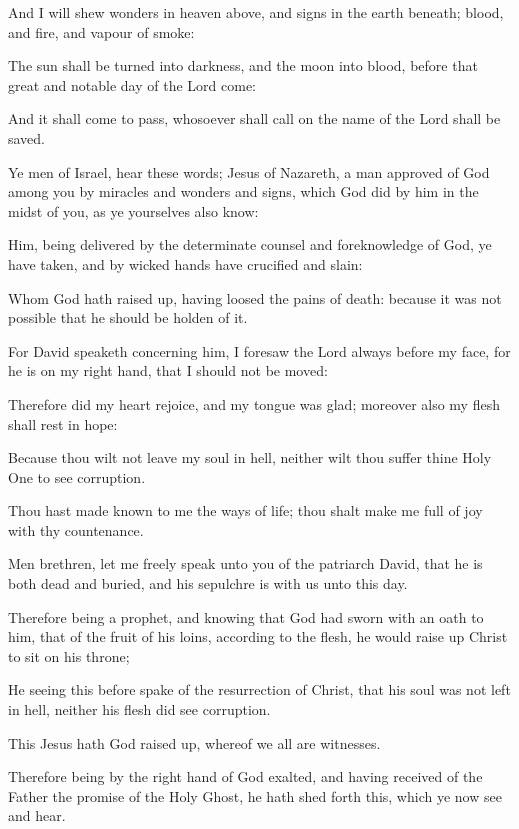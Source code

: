 {And I will
shew
wonders
in
heaven
above,
and
signs
in the
earth
beneath;
blood,
and
fire,
and
vapour of
smoke:

The
sun shall be
turned
into
darkness,
and the
moon
into
blood, before
that
great
and
notable
day of the
Lord
come:

And it shall come to
pass,
{}
whosoever shall call
on the
name of the
Lord shall be
saved.

Ye
men of
Israel,
hear
these
words;
Jesus of
Nazareth, a
man
approved
of
God
among
you
by
miracles
and
wonders
and
signs,
which
God
did
by
him
in the
midst of
you,
as ye
yourselves
also
know:

Him, being
delivered by
the
determinate
counsel
and
foreknowledge of
God, ye have
taken, and
by
wicked
hands have
crucified and
slain:

Whom
God hath raised
up, having
loosed the
pains of
death:
because it
was
not
possible
that
he should be
holden
of
it.

For
David
speaketh
concerning
him, I
foresaw the
Lord
always
before my
face,
for he
is
on
my right
hand,
that I
should
not be
moved:

Therefore
did
my
heart
rejoice,
and
my
tongue was
glad;
moreover
also
my
flesh shall
rest
in
hope:

Because thou
wilt
not
leave
my
soul
in
hell,
neither wilt thou
suffer
thine Holy
One to
see
corruption.

Thou hast made
known to
me the
ways of
life; thou shalt
make
me
full of
joy
with
thy
countenance.

Men
{}
brethren,
let
me
freely
speak
unto
you
of the
patriarch
David,
that he
is
both
dead
and
buried,
and
his
sepulchre
is
with
us
unto
this
day.

Therefore
being a
prophet,
and
knowing
that
God had
sworn with an
oath to
him,
that
of the
fruit of
his
loins, according
to the
flesh, he would raise
up
Christ to
sit
on
his
throne;

He seeing
this before
spake
of the
resurrection of
Christ,
that
his
soul
was
not
left
in
hell,
neither
his
flesh did
see
corruption.

This
Jesus
hath
God raised
up,
whereof
we
all
are
witnesses.

Therefore
being by the right
hand of
God
exalted,
and having
received
of the
Father the
promise of
the
Holy
Ghost, he hath shed
forth
this,
which
ye
now
see
and
hear.

}
